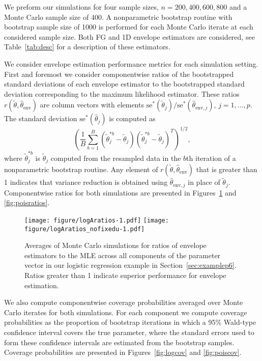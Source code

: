\documentclass{article}\usepackage[]{graphicx}\usepackage[]{color}
\begin{document}
We preform our simulations for four sample sizes, $n = 200, 400, 600, 800$ and a Monte Carlo sample size of 400. A nonparametric bootstrap routine with bootstrap sample size of 1000 is performed for each Monte Carlo iterate at each considered sample size. Both FG and 1D envelope estimators are considered, see Table~\ref{tab:desc} for a description of these estimators.


We consider envelope estimation performance metrics for each simulation setting. First and foremost we consider componentwise ratios of the bootstrapped standard deviations of each envelope estimator to the bootstrapped standard deviation corresponding to the maximum likelihood estimator. These ratios $r(\tilde\theta, \widehat\theta_\text{env})$ are column vectors with elements $\text{se}^{\textstyle{*}}(\tilde{\theta}_{j})/\text{se}^{\textstyle{*}}(\widehat{\theta}_{\text{env},j})$, $j = 1,\ldots,p$. The standard deviation $\text{se}^{*}(\widehat{\theta}_{j})$ is computed as
$$
	\left(\frac{1}{B}\sum_{b=1}^B(\tilde{\theta}_{j}^{\textstyle{*}b} - \tilde{\theta}_{j})
    	(\tilde{\theta}_{j}^{\textstyle{*}b} - \tilde{\theta}_{j})^T\right)^{1/2}, 
$$ 
where $\tilde{\theta}_{j}^{\textstyle{*}b}$ is $\tilde{\theta}_{j}$ computed from the resampled data in the $b$th iteration of a nonparametric bootstrap routine. Any element of $r(\tilde\theta, \widehat\theta_\text{env})$ that is greater than 1 indicates that variance reduction is obtained using $\widehat\theta_{\text{env},j}$ in place of $\tilde\theta_j$. Componentwise ratios for both simulations are presented in Figures~\ref{fig:logratios} and \ref{fig:poisratios}.

\begin{figure}[h!]
	\texttt{[image: figure/logAratios-1.pdf]}
\texttt{[image: figure/logAratios\_nofixedu-1.pdf]}
	\caption{Averages of Monte Carlo simulations for ratios of envelope estimators to the MLE across all components of the parameter vector in our logistic regression example in Section~\ref{sec:examplep6}. Ratios greater than 1 indicate superior performance for envelope estimation.}
	\label{fig:logratios}
\end{figure}


We also compute componentwise coverage probabilities averaged over Monte Carlo iterates for both simulations. For each component we compute coverage probabilities as the proportion of bootstrap iterations in which a 95\% Wald-type confidence interval covers the true parameter, where the standard errors used to form these confidence intervals are estimated from the bootstrap samples. Coverage probabilities are presented in Figures~\ref{fig:logcov} and \ref{fig:poiscov}. 
\end{document}
